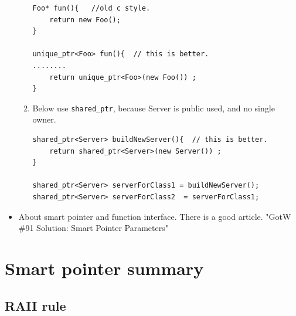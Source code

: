\documentclass[a4paper,11pt,twoside]{book}
\begin{document}
\begin{itemize}
\begin{enumerate}
\begin{lstlisting}[numbers=none]
Foo* fun(){   //old c style.
	return new Foo();
}

unique_ptr<Foo> fun(){  // this is better.
........
	return unique_ptr<Foo>(new Foo()) ;
}
\end{lstlisting}

\item Below use \texttt{shared\_ptr}, because Server is public used, and no single owner.
\begin{lstlisting}[numbers=none]
shared_ptr<Server> buildNewServer(){  // this is better.
	return shared_ptr<Server>(new Server()) ;
}

shared_ptr<Server> serverForClass1 = buildNewServer();
shared_ptr<Server> serverForClass2  = serverForClass1;
\end{lstlisting}

\end{enumerate}

\item About smart pointer and function interface. There is a good article. "GotW \#91 Solution: Smart Pointer Parameters"
\end{itemize}



\section{Smart pointer summary}

\subsection{RAII rule}
\end{document}
